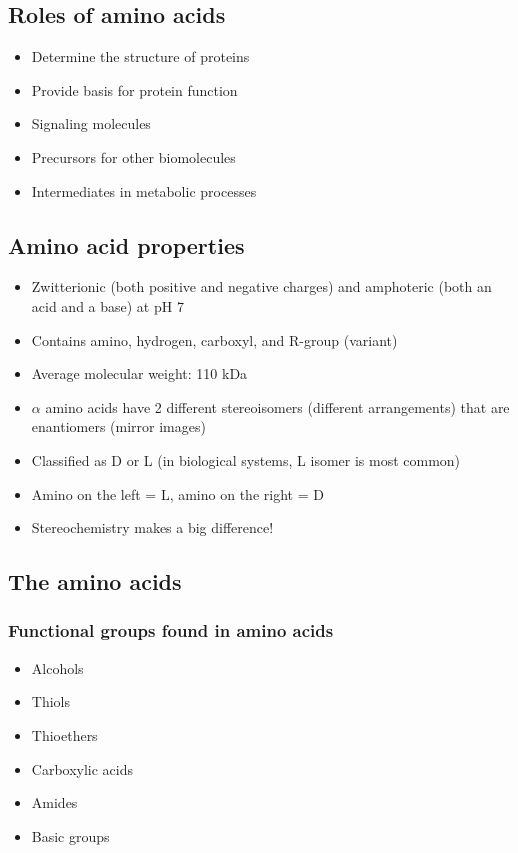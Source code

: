 \documentclass[letterpaper, 12pt]{article}
\begin{document}
\subsection*{Roles of amino acids}

\begin{itemize}
\item Determine the structure of proteins
\item Provide basis for protein function
\item Signaling molecules
\item Precursors for other biomolecules
\item Intermediates in metabolic processes
\end{itemize}

\subsection*{Amino acid properties}
\begin{itemize}
\item Zwitterionic (both positive and negative charges) and amphoteric (both an acid and a base) at pH 7
\item Contains amino, hydrogen, carboxyl, and R-group (variant)
\item Average molecular weight: 110 kDa
\item $\alpha$ amino acids have 2 different stereoisomers (different arrangements) that are enantiomers (mirror images)
\item Classified as D or L (in biological systems, L isomer is most common)
\item Amino on the left = L, amino on the right = D
\item Stereochemistry makes a big difference!
\end{itemize}

\subsection*{The amino acids}

\subsubsection*{Functional groups found in amino acids}

\begin{itemize}
\item Alcohols
\item Thiols
\item Thioethers
\item Carboxylic acids
\item Amides
\item Basic groups
\end{itemize}
\end{document}

